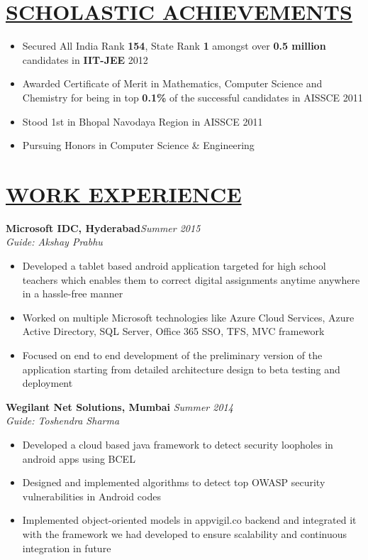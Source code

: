 \documentclass[11pt]{res}
\begin{document}
\thispagestyle{empty} %
\begin{resume}
\vspace{10ex}

\section{\underline{SCHOLASTIC ACHIEVEMENTS}}
\begin{itemize} \itemsep -2pt
\item Secured All India Rank \textbf{154}, State Rank \textbf{1} amongst over \textbf{0.5 million} candidates in \textbf{IIT-JEE} 2012 
\item Awarded Certificate of Merit in Mathematics, Computer Science and Chemistry for being in top \textbf{0.1\%} of the successful candidates in AISSCE 2011
\item Stood 1st in Bhopal Navodaya Region in AISSCE 2011
\item Pursuing Honors in Computer Science \& Engineering
\end{itemize}

\vspace{-15pt}
\section{\underline{WORK EXPERIENCE}} 
\vspace{3pt}
\textbf{Microsoft IDC, Hyderabad}\hfill \emph{Summer 2015}\\
\textsl{Guide: Akshay Prabhu} \hfill  
\begin{itemize} \itemsep -2pt %
   \item Developed a tablet based android application targeted for high school teachers which enables them to correct digital assignments anytime anywhere in a hassle-free manner 
   \item Worked on multiple Microsoft technologies like Azure Cloud Services, Azure Active Directory, SQL Server, Office 365 SSO, TFS,  MVC framework
   \item Focused on end to end development of the preliminary version of the application starting from detailed architecture design to beta testing and deployment
\end{itemize}

\vspace{-10pt}
\textbf{Wegilant Net Solutions, Mumbai} \hfill \emph{Summer 2014}\\
\textsl{Guide: Toshendra Sharma} \hfill  
 \begin{itemize} \itemsep -2pt
\item Developed a cloud based java framework to detect security loopholes in android apps using BCEL
\item Designed and implemented algorithms to detect top OWASP security vulnerabilities in Android codes
\item Implemented object-oriented models in appvigil.co backend and integrated it with the framework we had developed to ensure scalability and continuous integration in future
\end{itemize}


\end{resume}
\end{document}
